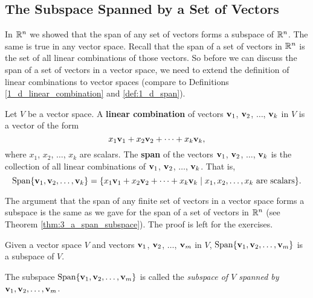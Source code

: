 \subsection*{The Subspace Spanned by a Set of Vectors}

In $\mathbb{R}^n$ we showed that the span of any set of vectors forms a subspace of $\mathbb{R}^n$. The same is true in any vector space. Recall that the span of a set of vectors in $\mathbb{R}^n$ is the set of all linear combinations of those vectors. So before we can discuss the span of a set of vectors in a vector space, we need to extend the definition of linear combinations to vector spaces (compare to Definitions \ref{1_d_linear_combination} and \ref{def:1_d_span}).   



\begin{definition} Let $V$ be a vector space. A \textbf{linear combination} of vectors $\mathbf{v}_1$, $\mathbf{v}_2$, $\ldots$, $\mathbf{v}_k$ in $V$ is a vector of the form 
\[x_1\mathbf{v}_1+x_2\mathbf{v}_2 + \cdots + x_k \mathbf{v}_k,\]
where $x_1$, $x_2$, $\ldots$, $x_k$ are scalars. The \textbf{span} of the vectors $\mathbf{v}_1$, $\mathbf{v}_2$, $\ldots$, $\mathbf{v}_k$ is the collection of all linear combinations of $\mathbf{v}_1$, $\mathbf{v}_2$, $\ldots$, $\mathbf{v}_k$. That is,
\[\text{Span}\{\mathbf{v}_1, \mathbf{v}_2, \ldots, \mathbf{v}_k\} = \{x_1\mathbf{v}_1+x_2\mathbf{v}_2 + \cdots + x_k \mathbf{v}_k \mid x_1, x_2, \ldots, x_k \text{ are scalars}\}.\]
\end{definition}



The argument that the span of any finite set of vectors in a vector space forms a subspace is the same as we gave for the span of a set of vectors in $\mathbb{R}^n$ (see Theorem \ref{thm:3_a_span_subspace}). The proof is left for the exercises.   



\begin{theorem} \label{thm:VS_span} Given a vector space $V$ and vectors $\mathbf{v}_1$, $\mathbf{v}_2$, $\ldots$, $\mathbf{v}_m$ in $V$, $\text{Span}\{\mathbf{v}_1, \mathbf{v}_2, \ldots, \mathbf{v}_m\}$ is a subspace of $V$.
\end{theorem}


The subspace $\text{Span}\{\mathbf{v}_1, \mathbf{v}_2, \ldots, \mathbf{v}_m\}$ is called the \emph{subspace of $V$ spanned by $\mathbf{v}_1, \mathbf{v}_2, \ldots, \mathbf{v}_m$}.


